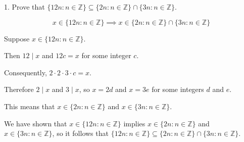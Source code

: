 \documentclass{idrisMemo}
\newcommand{\set}[1]{\{#1\}}
\begin{document}
\toc
\thispagestyle{styleTOC}
\pagebreak
\pagestyle{styleE}

\begin{prooflist}{1. Prove that $\{12 n: n \in \mathbb{Z}\} \subseteq\{2 n: n \in \mathbb{Z}\} \cap\{3 n: n \in \mathbb{Z}\}$.}
\item

\[
x \in \{12 n: n \in \mathbb{Z}\}
\implies
x \in \{2 n: n \in \mathbb{Z}\} \cap\{3 n: n \in \mathbb{Z}\}
\]
\item Suppose $x \in \{12 n: n \in \mathbb{Z}\}$.
\item Then $12 \mid x$ and $12c=x$
    for some integer $c$.
\item Consequently, $2\cdot2\cdot3\cdot c =x$.
\item Therefore $2\mid x$ and $3\mid x$, so $x =2d$ and $x=3e$ for some integers
    $d$ and $e$.
\item
This means that $x \in \{2 n: n \in \mathbb{Z}\}$ and $x \in \{3 n: n \in
    \mathbb{Z}\}$.
\item
We have shown that
$x \in \{12 n: n \in \mathbb{Z}\}$
implies
$x \in\{2n: n \in \mathbb{Z}\}$
and
$x \in\{3n: n \in \mathbb{Z}\}$,
so it follows that
$\set{12 n: n \in \mathbb{Z}} \subseteq\set{2 n: n \in \mathbb{Z}} \cap\{3 n: n \in
\mathbb{Z}\}$.
\end{prooflist}
\end{document}
